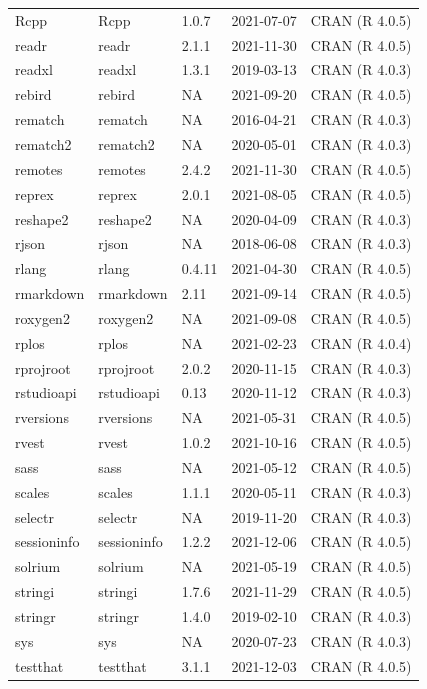 \begin{tabular}{lllll}
Rcpp & Rcpp & 1.0.7 & 2021-07-07 & CRAN (R 4.0.5)\\
readr & readr & 2.1.1 & 2021-11-30 & CRAN (R 4.0.5)\\
readxl & readxl & 1.3.1 & 2019-03-13 & CRAN (R 4.0.3)\\
rebird & rebird & NA & 2021-09-20 & CRAN (R 4.0.5)\\
\addlinespace
rematch & rematch & NA & 2016-04-21 & CRAN (R 4.0.3)\\
rematch2 & rematch2 & NA & 2020-05-01 & CRAN (R 4.0.3)\\
remotes & remotes & 2.4.2 & 2021-11-30 & CRAN (R 4.0.5)\\
reprex & reprex & 2.0.1 & 2021-08-05 & CRAN (R 4.0.5)\\
reshape2 & reshape2 & NA & 2020-04-09 & CRAN (R 4.0.3)\\
\addlinespace
rjson & rjson & NA & 2018-06-08 & CRAN (R 4.0.3)\\
rlang & rlang & 0.4.11 & 2021-04-30 & CRAN (R 4.0.5)\\
rmarkdown & rmarkdown & 2.11 & 2021-09-14 & CRAN (R 4.0.5)\\
roxygen2 & roxygen2 & NA & 2021-09-08 & CRAN (R 4.0.5)\\
rplos & rplos & NA & 2021-02-23 & CRAN (R 4.0.4)\\
\addlinespace
rprojroot & rprojroot & 2.0.2 & 2020-11-15 & CRAN (R 4.0.3)\\
rstudioapi & rstudioapi & 0.13 & 2020-11-12 & CRAN (R 4.0.3)\\
rversions & rversions & NA & 2021-05-31 & CRAN (R 4.0.5)\\
rvest & rvest & 1.0.2 & 2021-10-16 & CRAN (R 4.0.5)\\
sass & sass & NA & 2021-05-12 & CRAN (R 4.0.5)\\
\addlinespace
scales & scales & 1.1.1 & 2020-05-11 & CRAN (R 4.0.3)\\
selectr & selectr & NA & 2019-11-20 & CRAN (R 4.0.3)\\
sessioninfo & sessioninfo & 1.2.2 & 2021-12-06 & CRAN (R 4.0.5)\\
solrium & solrium & NA & 2021-05-19 & CRAN (R 4.0.5)\\
stringi & stringi & 1.7.6 & 2021-11-29 & CRAN (R 4.0.5)\\
\addlinespace
stringr & stringr & 1.4.0 & 2019-02-10 & CRAN (R 4.0.3)\\
sys & sys & NA & 2020-07-23 & CRAN (R 4.0.3)\\
testthat & testthat & 3.1.1 & 2021-12-03 & CRAN (R 4.0.5)\\

\end{tabular}
